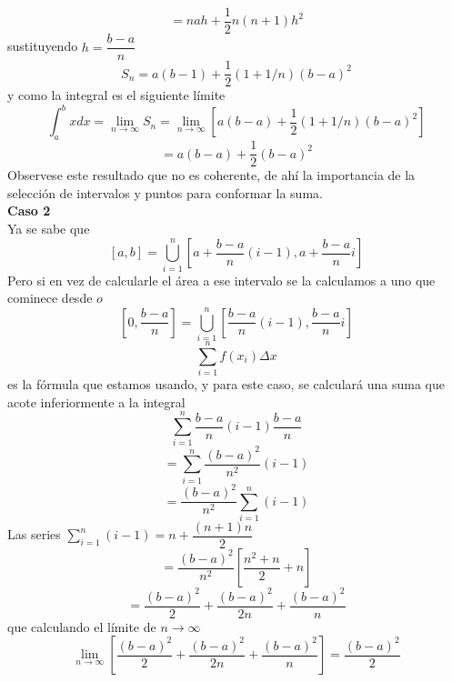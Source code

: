 \documentclass[10pt,twoside]{SelfArx} %
\begin{document}
\begin{ejemplo}
	\begin{equation}
=nah+\dfrac{1}{2}n(n+1)h^{2}	
	\end{equation}
	sustituyendo $ h=\dfrac{b-a}{n} $
	\begin{equation}
	S_{n}=a(b-1)+\dfrac{1}{2}(1+1/n)(b-a)^{2}
	\end{equation}
	y como la integral es el siguiente límite
	\begin{equation}
	\int_{a}^{b}xdx=\lim\limits_{n\rightarrow\infty}S_{n}=\lim\limits_{n\rightarrow\infty}\left [a(b-a)+\dfrac{1}{2}(1+1/n)(b-a)^{2}\right]
	\end{equation}
	\begin{equation}
	=a(b-a)+\dfrac{1}{2}(b-a)^{2}
	\end{equation}
	Observese este resultado que no es coherente, de ahí la importancia de la selección de intervalos y puntos para conformar la suma.\\
	\textbf{Caso 2}\\
	Ya se sabe que 
	\[ [a,b]=\bigcup_{i=1}^{n}\left [a+\dfrac{b-a}{n}(i-1),a+\dfrac{b-a}{n}i\right ] \]
	Pero si en vez de calcularle el área a ese intervalo se la calculamos a uno que cominece desde $ o $
\[ 	\left [0,\dfrac{b-a}{n}\right ]=\bigcup_{i=1}^{n}\left [\dfrac{b-a}{n}(i-1),\dfrac{b-a}{n}i\right ] \]
\begin{equation}
\sum_{i=1}^{n}f(x_{i})\Delta x
\end{equation}
es la f\'ormula  que estamos usando, y para este caso, se calculará una suma que acote inferiormente a la integral
\begin{equation}
\sum_{i=1}^{n}\dfrac{b-a}{n}(i-1)\dfrac{b-a}{n}
\end{equation}
\begin{equation}
=\sum_{i=1}^{n}\dfrac{(b-a)^{2}}{n^{2}}(i-1)
\end{equation}
\begin{equation}
=\dfrac{(b-a)^{2}}{n^{2}}\sum_{i=1}^{n}(i-1)
\end{equation}
Las series $ \sum_{i=1}^{n}(i-1)=n+\dfrac{(n+1)n}{2} $
\begin{equation}
=\dfrac{(b-a)^{2}}{n^{2}}\left [\dfrac{n^{2}+n}{2}+n\right ]
\end{equation}
\begin{equation}
=\dfrac{(b-a)^{2}}{2}+\dfrac{(b-a)^{2}}{2n}+\dfrac{(b-a)^{2}}{n}
\end{equation}
que calculando el límite de $ n\rightarrow\infty $
\begin{equation}
\lim\limits_{n\rightarrow\infty}\left [\dfrac{(b-a)^{2}}{2}+\dfrac{(b-a)^{2}}{2n}+\dfrac{(b-a)^{2}}{n}\right ]=\dfrac{(b-a)^{2}}{2}

\end{equation}
\end{ejemplo}
\end{document}
